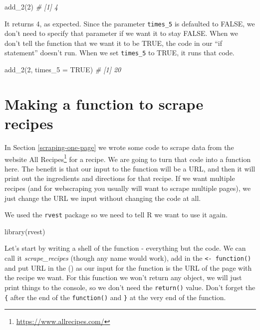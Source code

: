 \documentclass[
  a4paper,
]{krantz}
\makeatletter
\newenvironment{Shaded}{\begin{snugshade}}{\end{snugshade}}
\newcommand{\AttributeTok}[1]{\textcolor[rgb]{0.61,0.61,0.61}{#1}}
\newcommand{\CommentTok}[1]{\textcolor[rgb]{0.37,0.37,0.37}{\textit{#1}}}
\newcommand{\ConstantTok}[1]{\textcolor[rgb]{0,0,0}{#1}}
\newcommand{\DecValTok}[1]{\textcolor[rgb]{0.06,0.06,0.06}{#1}}
\newcommand{\FunctionTok}[1]{\textcolor[rgb]{0,0,0}{#1}}
\newcommand{\NormalTok}[1]{#1}
\renewcommand{\href}[2]{#2\footnote{\url{#1}}}
\newenvironment{kframe}{%
\medskip{}
\setlength{\fboxsep}{.8em}
 \def\at@end@of@kframe{}%
 \ifinner\ifhmode%
  \def\at@end@of@kframe{\end{minipage}}%
  \begin{minipage}{\columnwidth}%
 \fi\fi%
 \def\FrameCommand##1{\hskip\@totalleftmargin \hskip-\fboxsep
 \colorbox{shadecolor}{##1}\hskip-\fboxsep
     \hskip-\linewidth \hskip-\@totalleftmargin \hskip\columnwidth}%
 \MakeFramed {\advance\hsize-\width
   \@totalleftmargin\z@ \linewidth\hsize
   \@setminipage}}%
 {\par\unskip\endMakeFramed%
 \at@end@of@kframe}
\renewenvironment{Shaded}{\begin{kframe}}{\end{kframe}}
\makeatother
\begin{document}
\begin{Shaded}
\begin{Highlighting}[]
\FunctionTok{add\_2}\NormalTok{(}\DecValTok{2}\NormalTok{)}
\CommentTok{\# [1] 4}
\end{Highlighting}
\end{Shaded}

It returns 4, as expected. Since the parameter
\texttt{times\_5} is defaulted to FALSE, we don't need to
specify that parameter if we want it to stay FALSE. When we
don't tell the function that we want it to be TRUE, the code
in our ``if statement'' doesn't run. When we set
\texttt{times\_5} to TRUE, it runs that code.

\begin{Shaded}
\begin{Highlighting}[]
\FunctionTok{add\_2}\NormalTok{(}\DecValTok{2}\NormalTok{, }\AttributeTok{times\_5 =} \ConstantTok{TRUE}\NormalTok{)}
\CommentTok{\# [1] 20}
\end{Highlighting}
\end{Shaded}

\hypertarget{recipes-function}{%
\section{Making a function to scrape
recipes}\label{recipes-function}}

In Section \ref{scraping-one-page} we wrote some code to
scrape data from the website
\href{https://www.allrecipes.com/}{All Recipes} for a
recipe. We are going to turn that code into a function here.
The benefit is that our input to the function will be a URL,
and then it will print out the ingredients and directions
for that recipe. If we want multiple recipes (and for
webscraping you usually will want to scrape multiple pages),
we just change the URL we input without changing the code at
all.

We used the \texttt{rvest} package so we need to tell R we
want to use it again.

\begin{Shaded}
\begin{Highlighting}[]
\FunctionTok{library}\NormalTok{(rvest)}
\end{Highlighting}
\end{Shaded}

Let's start by writing a shell of the function - everything
but the code. We can call it \emph{scrape\_recipes} (though
any name would work), add in the
\texttt{\textless{}-\ function()} and put URL in the () as
our input for the function is the URL of the page with the
recipe we want. For this function we won't return any
object, we will just print things to the console, so we
don't need the \texttt{return()} value. Don't forget the
\texttt{\{} after the end of the \texttt{function()} and
\texttt{\}} at the very end of the function.
\end{document}
